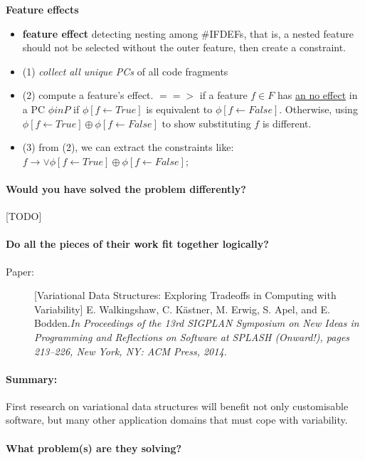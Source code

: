\documentclass[12pt]{article}
\begin{document}
\textbf{Feature effects}
\begin{itemize}
	\item \textbf{feature effect} detecting nesting among \#IFDEFs, that is, a nested feature should not be selected without the outer feature, then create a constraint.
	\item (1) \textit{collect all unique PCs} of all code fragments
	\item (2) compute a feature's effect. $==>$ if a feature $f \in F$ has \underline{an no effect} in a PC $\phi in P$ if $\phi[f\leftarrow True]$ is equivalent to $\phi[f\leftarrow False]$. Otherwise, using $\phi[f\leftarrow True] \oplus \phi[f\leftarrow False]$ to show substituting $f$ is different.
	\item (3) from (2), we can extract the constraints like: $f\rightarrow \vee \phi\left [ f\leftarrow True \right ]\oplus \phi\left [ f\leftarrow False \right ]$;
\end{itemize}

\paragraph{Would you have solved the problem differently?}[TODO]
\paragraph{Do all the pieces of their work fit together logically?}




\clearpage
\begin{description}
\item[Paper:] [Variational Data Structures: Exploring Tradeoffs in Computing with Variability] E. Walkingshaw, C. Kästner, M. Erwig, S. Apel, and E. Bodden.\emph{In Proceedings of the 13rd SIGPLAN Symposium on New Ideas in Programming and Reflections on Software at SPLASH (Onward!), pages 213--226, New York, NY: ACM Press, 2014.} 
\end{description}

\paragraph{Summary:} First research on variational data structures will benefit not only customisable software, but many other application domains that must cope with variability.

\paragraph{What problem(s) are they solving?} 
\end{document}
